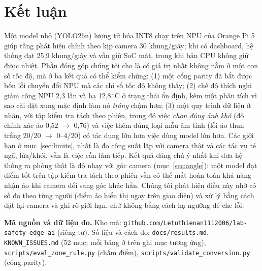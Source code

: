 \documentclass[12pt,a4paper]{article}
\newcommand{\file}[1]{\texttt{\small #1}}
\begin{document}
\section{Kết luận}

Một model nhỏ (YOLO26n) lượng tử hóa INT8 chạy trên NPU của Orange Pi 5 giúp tầng phát hiện chính theo kịp camera
30 khung/giây; khi có dashboard, hệ thống đạt 25,9 khung/giây và vẫn giữ SoC mát,
trong khi bản CPU không giữ được nhiệt. Phần đóng góp chúng tôi cho là có giá trị nhất không nằm ở một con số tốc độ,
mà ở ba kết quả có thể kiểm chứng: (1) một cổng parity đã bắt được bốn lỗi chuyển đổi NPU mà các chỉ số tốc độ không
thấy; (2) chế độ thích nghi giảm công NPU 2,3 lần và hạ 12,8\,$^\circ$C ở trạng thái ổn định, kèm một phân tích vì sao
cài đặt xung mặc định làm nó \emph{trông} chậm hơn; (3) một quy trình dữ liệu ít nhãn, với tập kiểm tra tách theo phiên,
trong đó việc \emph{chọn đúng ảnh khó} (độ chính xác áo 0,52 $\to$ 0,76) và việc thêm đúng loại mẫu âm tính (lỗi áo
thun trắng 20/20 $\to$ 0--4/20) có tác dụng lớn hơn việc dùng model lớn hơn. Các giới hạn ở mục~\ref{sec:limits}, nhất là
đo công suất lặp với camera thật và các tác vụ té ngã, lửa/khói, vẫn là việc cần làm tiếp. Kết quả đáng chú ý nhất khi đưa hệ thống ra phòng thật là độ nhạy với góc camera
(mục~\ref{sec:angle}): một model đạt điểm tốt trên tập kiểm tra tách theo phiên vẫn có thể mất hoàn toàn khả năng nhận áo khi camera đổi sang góc khác hẳn. Chúng tôi
phát hiện điều này nhờ có số đo theo từng người (điểm áo hiển thị ngay trên giao diện) và xử lý bằng cách đặt lại camera và ghi rõ giới hạn, chứ không bằng cách hạ ngưỡng
để che lỗi.

\vspace{1em}
\noindent\textbf{Mã nguồn và dữ liệu đo.} Kho mã: \texttt{github.com/Letuthienan1112006/lab-safety-edge-ai}
(riêng tư). Số liệu và cách đo: \file{docs/results.md}, \file{KNOWN\_ISSUES.md} (52 mục; mỗi bảng ở trên ghi mục
tương ứng), \file{scripts/eval\_zone\_rule.py} (chấm điểm), \file{scripts/validate\_conversion.py} (cổng parity).
\end{document}

